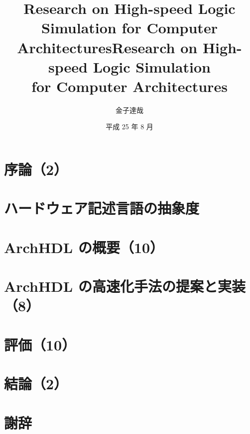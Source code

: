 \documentclass[12pt,openany,papersize,]{jsbook}
\title{Research on High-speed Logic Simulation for Computer Architectures}
\affiliation{情報工学科}
\title{Research on High-speed Logic Simulation \\ for Computer Architectures}
\author{金子達哉}
\date{平成 25 年 8 月}
\begin{document}
\maketitle

\frontmatter

\tableofcontents

\mainmatter

\chapter{序論（2）}



 \chapter{ハードウェア記述言語の抽象度} \fi

\chapter{ArchHDL の概要（10）}

\label{c:summary}



\chapter{ArchHDL の高速化手法の提案と実装（8）}

\label{c:method}



\chapter{評価（10）}

\label{c:evaluation}



\chapter{結論（2）}

\label{c:conclusion}



\backmatter

\chapter{謝辞}

\label{c:acknowledgment}



\label{c:relatedwork}


\end{document}

